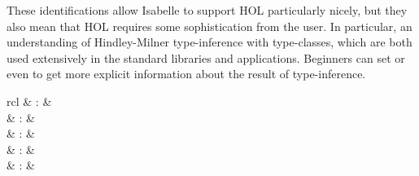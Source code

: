\begin{isabellebody}
\begin{isamarkuptext}
  These identifications allow Isabelle to support HOL particularly
  nicely, but they also mean that HOL requires some sophistication
  from the user.  In particular, an understanding of Hindley-Milner
  type-inference with type-classes, which are both used extensively in
  the standard libraries and applications.  Beginners can set
  \hyperlink{attribute.show-types}{\mbox{}} or even \hyperlink{attribute.show-sorts}{\mbox{}} to get more
  explicit information about the result of type-inference.%
\end{isamarkuptext}%
\isamarkuptrue%
%
\isamarkuptrue%
%
\begin{isamarkuptext}%
\begin{matharray}{rcl}
    \hypertarget{command.HOL.inductive}{\hyperlink{command.HOL.inductive}{\mbox{}}} & : &  \\
    \hypertarget{command.HOL.inductive-set}{\hyperlink{command.HOL.inductive-set}{\mbox{}}} & : &  \\
    \hypertarget{command.HOL.coinductive}{\hyperlink{command.HOL.coinductive}{\mbox{}}} & : &  \\
    \hypertarget{command.HOL.coinductive-set}{\hyperlink{command.HOL.coinductive-set}{\mbox{}}} & : &  \\
    \hypertarget{attribute.HOL.mono}{\hyperlink{attribute.HOL.mono}{\mbox{}}} & : &  \\
  \end{matharray}


\end{isamarkuptext}
\end{isabellebody}
